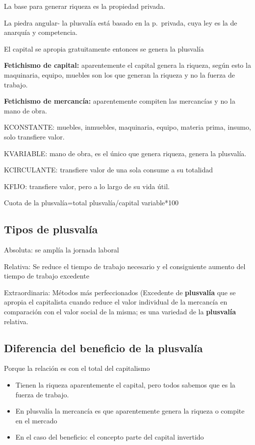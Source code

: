 \documentclass[
  letterpaper,
  DIV=11,
  numbers=noendperiod]{scrartcl}
\begin{document}
La base para generar riqueza es la propiedad privada.

La piedra angular- la plusvalía está basado en la p.~privada, cuya ley
es la de anarquía y competencia.

El capital se apropia gratuitamente entonces se genera la plusvalía

\textbf{Fetichismo de capital:} aparentemente el capital genera la
riqueza, según esto la maquinaria, equipo, muebles son los que generan
la riqueza y no la fuerza de trabajo.

\textbf{Fetichismo de mercancía:} aparentemente compiten las mercancías
y no la mano de obra.

KCONSTANTE: muebles, inmuebles, maquinaria, equipo, materia prima,
insumo, solo transfiere valor.

KVARIABLE: mano de obra, es el único que genera riqueza, genera la
plusvalía.

KCIRCULANTE: transfiere valor de una sola consume a su totalidad

KFIJO: transfiere valor, pero a lo largo de su vida útil.

Cuota de la plusvalía=total plusvalía/capital variable*100

\hypertarget{tipos-de-plusvaluxeda-1}{%
\subsection{Tipos de plusvalía}\label{tipos-de-plusvaluxeda-1}}

Absoluta: se amplía la jornada laboral

Relativa: Se reduce el tiempo de trabajo necesario y el consiguiente
aumento del tiempo de trabajo excedente

Extraordinaria: Métodos más perfeccionados (Excedente de
\textbf{plusvalía} que se apropia el capitalista cuando reduce el valor
individual de la mercancía en comparación con el valor social de la
misma; es una variedad de la \textbf{plusvalía} relativa.

\hypertarget{diferencia-del-beneficio-de-la-plusvaluxeda}{%
\subsection{Diferencia del beneficio de la
plusvalía}\label{diferencia-del-beneficio-de-la-plusvaluxeda}}

Porque la relación es con el total del capitalismo

\begin{itemize}
\item
  Tienen la riqueza aparentemente el capital, pero todos sabemos que es
  la fuerza de trabajo.
\item
  En plusvalía la mercancía es que aparentemente genera la riqueza o
  compite en el mercado
\item
  En el caso del beneficio: el concepto parte del capital invertido
\end{itemize}
\end{document}
